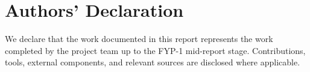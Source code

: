 \chapter*{Authors' Declaration}
We declare that the work documented in this report represents the work completed by the project team up to the FYP-1 mid-report stage. Contributions, tools, external components, and relevant sources are disclosed where applicable.

